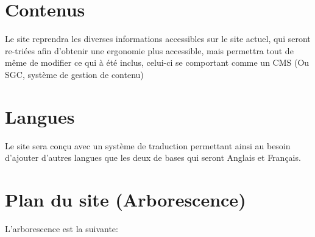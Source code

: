 \documentclass[oneside]{report}
\begin{document}
{		\section{Contenus}
		{
			\par Le site reprendra les diverses informations accessibles sur le site actuel, qui seront re-triées afin d’obtenir une ergonomie plus accessible, mais permettra tout de même de modifier ce qui à été inclus, celui-ci se comportant comme un CMS (Ou SGC, système de gestion de contenu)
		}
		\section{Langues}
		{
			\par Le site sera conçu avec un système de traduction permettant ainsi au besoin d'ajouter d'autres langues que les deux de bases qui seront Anglais et Français.
		}

		\section{Plan du site (Arborescence)}
		{
			\par L'arborescence est la suivante:\\
			\noindent{}
		}

}
\end{document}
